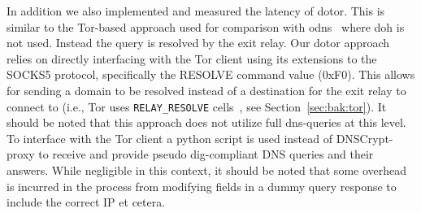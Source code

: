 In addition we also implemented and measured the latency of \ac{dotor}. This is
similar to the Tor-based approach used for comparison with
\ac{odns}~\cite{ODNS} where \ac{doh} is not used. Instead the query is resolved
by the exit relay. Our \ac{dotor} approach relies on directly interfacing with
the Tor client using its extensions to the SOCKS5 protocol, specifically the
RESOLVE command value (0xF0)\cite{tor-socks5}. This allows for sending a domain
to be resolved instead of a destination for the exit relay to connect to (i.e.,
Tor uses \texttt{RELAY\_RESOLVE} cells~\cite{TorSpecResolve}, see
Section~\ref{sec:bak:tor}). It should be noted that this approach does not
utilize full \ac{dns}-queries at this level. To interface with the Tor client a
python script is used instead of DNSCrypt-proxy to receive and provide pseudo
dig-compliant DNS queries and their answers. While negligible in this context,
it should be noted that some overhead is incurred in the process from modifying
fields in a dummy query response to include the correct IP et cetera.



